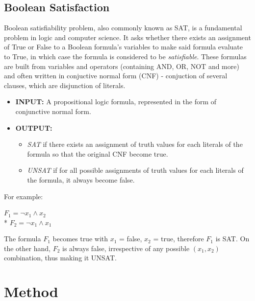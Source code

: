 \documentclass[a4paper,fleqn]{cas-sc}
\begin{document}
        \subsection{Boolean Satisfaction}
            Boolean satisfiability problem, also commonly known as SAT, is a fundamental problem in logic and computer science. It asks whether there exists an assignment of True or False to a Boolean formula's variables to make said formula evaluate to True, in which case the formula is considered to be \textit{satisfiable}. These formulas are built from variables and operators (containing AND, OR, NOT and more) and often written in conjuctive normal form (CNF) - conjuction of several clauses, which are disjunction of literals.
                        
            \begin{itemize}
                \item \textbf{INPUT:} A propositional logic formula, represented in the form of conjunctive normal form.
                \item \textbf{OUTPUT:}
                \begin{itemize}
                    \item \textit{SAT} if there exists an assignment of truth values for each literals of the formula so that the original CNF become true.
                    \item \textit{UNSAT} if for all possible assignments of truth values for each literals of the formula, it always become false.
                \end{itemize}
            \end{itemize}

            For example:
            \begin{center}
                \(\displaystyle F_1 = \neg x_1\wedge x_2\)
                \\*
                \(\displaystyle F_2 = \neg x_1 \wedge x_1\)
            \end{center}
            The formula $F_1$ becomes true with $x_1$ = false, $x_2$ = true, therefore $F_1$ is SAT. On the other hand, $F_2$ is always false, irrespective of any possible $(x_1, x_2)$ combination, thus making it UNSAT.

\section{Method}
\end{document}
